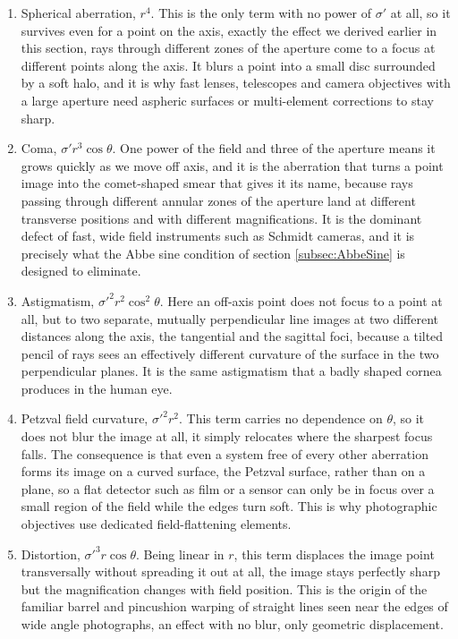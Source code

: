                     \begin{enumerate}
                        \item Spherical aberration, $r^4$. This is the only term with no power of $\sigma'$ at all, so it survives even for a point on the axis, exactly the effect we derived earlier in this section, rays through different zones of the aperture come to a focus at different points along the axis. It blurs a point into a small disc surrounded by a soft halo, and it is why fast lenses, telescopes and camera objectives with a large aperture need aspheric surfaces or multi-element corrections to stay sharp.
                        \item Coma, $\sigma'r^3\cos\theta$. One power of the field and three of the aperture means it grows quickly as we move off axis, and it is the aberration that turns a point image into the comet-shaped smear that gives it its name, because rays passing through different annular zones of the aperture land at different transverse positions and with different magnifications. It is the dominant defect of fast, wide field instruments such as Schmidt cameras, and it is precisely what the Abbe sine condition of section \ref{subsec:AbbeSine} is designed to eliminate.
                        \item Astigmatism, $\sigma'^2r^2\cos^2\theta$. Here an off-axis point does not focus to a point at all, but to two separate, mutually perpendicular line images at two different distances along the axis, the tangential and the sagittal foci, because a tilted pencil of rays sees an effectively different curvature of the surface in the two perpendicular planes. It is the same astigmatism that a badly shaped cornea produces in the human eye.
                        \item Petzval field curvature, $\sigma'^2r^2$. This term carries no dependence on $\theta$, so it does not blur the image at all, it simply relocates where the sharpest focus falls. The consequence is that even a system free of every other aberration forms its image on a curved surface, the Petzval surface, rather than on a plane, so a flat detector such as film or a sensor can only be in focus over a small region of the field while the edges turn soft. This is why photographic objectives use dedicated field-flattening elements.
                        \item Distortion, $\sigma'^3r\cos\theta$. Being linear in $r$, this term displaces the image point transversally without spreading it out at all, the image stays perfectly sharp but the magnification changes with field position. This is the origin of the familiar barrel and pincushion warping of straight lines seen near the edges of wide angle photographs, an effect with no blur, only geometric displacement.
                    \end{enumerate}

